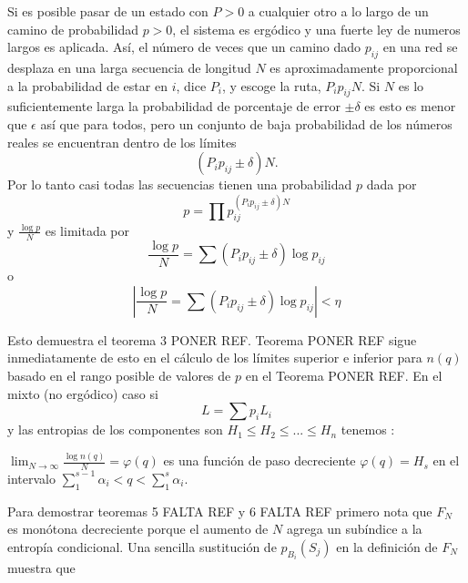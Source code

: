 \begin{appendices}
Si es posible pasar de un estado con $P>0$ a cualquier otro a lo largo
de un camino de probabilidad $p>0$, el sistema es erg\'odico y una
fuerte ley de numeros largos es aplicada.  As\'i, el n\'umero de veces
que un camino dado $p_{ij}$ en una red se desplaza en una larga
secuencia de longitud $N$ es aproximadamente proporcional a la
probabilidad de estar en $i$, dice $P_{i}$, y escoge la ruta,
$P_{i}p_{ij}N$. Si $N$ es lo suficientemente larga la probabilidad de
porcentaje de error $\pm\delta$ es esto es menor que $\epsilon$ as\'i
que para todos, pero un conjunto de baja probabilidad de los n\'umeros
reales se encuentran dentro de los l\'imites
\begin{equation}
(P_{i}p_{ij}\pm \delta)N.
\end{equation}
Por lo tanto casi todas las secuencias tienen una probabilidad $p$ dada
por
\begin{equation}
p=\prod p_{ij}^{(P_{i}p_{ij}\pm \delta)N}
\end{equation}
y $\frac{\log  p}{N}$ es limitada por
\begin{equation}
\frac{\log  p}{N} = \sum (P_{i}p_{ij}\pm \delta)\log  p_{ij}
\end{equation}
o
\begin{equation}
\left|\frac{\log  p}{N} = \sum (P_{i}p_{ij}\pm \delta)\log p_{ij}\right|<\eta
\end{equation}

Esto demuestra el teorema 3 PONER REF. Teorema PONER REF sigue
inmediatamente de esto en el c\'alculo de los l\'imites superior e
inferior para $n(q)$ basado en el rango posible de valores de $p$ en
el Teorema PONER REF.  En el mixto (no erg\'{o}dico) caso si
\begin{equation}
L = \sum p_{i}L_{i}
\end{equation}
y las entropias de los componentes son $H_{1}\leq H_{2}\leq ... \leq
H_{n}$ tenemos :
\begin{theorem}
$\lim_{N\rightarrow \infty }\frac{\log n(q)}{N}=\varphi (q)$ es una
funci\'on de paso decreciente $\varphi (q)=H_{s}$ en el intervalo
$\sum_{1}^{s-1}\alpha_{i}<q<\sum_{1}^{s}\alpha_{i}$.
\label{aqui_va_su_numero}
\end{theorem}

Para demostrar teoremas 5 FALTA REF y 6 FALTA REF primero nota que
$F_{N}$ es mon\'otona decreciente porque el aumento de $N$ agrega un
sub\'indice a la entrop\'ia condicional. Una sencilla sustitución de
$p_{B_{i}}(S_{j})$ en la definici\'on de $F_{N}$ muestra que


\end{appendices}
